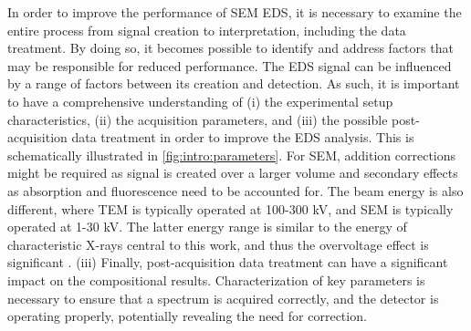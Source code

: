 In order to improve the performance of SEM EDS, it is necessary to examine the entire process from signal creation to interpretation, including the data treatment.
By doing so, it becomes possible to identify and address factors that may be responsible for reduced performance.
The EDS signal can be influenced by a range of factors between its creation and detection.
As such, it is important to have a comprehensive understanding of (i) the experimental setup characteristics, (ii) the acquisition parameters, and (iii) the possible post-acquisition data treatment in order to improve the EDS analysis.
This is schematically illustrated in \cref{fig:intro:parameters}.
For SEM, addition corrections might be required as signal is created over a larger volume and secondary effects as absorption and fluorescence need to be accounted for.
The beam energy is also different, where TEM is typically operated at 100-300 kV, and SEM is typically operated at 1-30 kV.
The latter energy range is similar to the energy of characteristic X-rays central to this work, and thus the overvoltage effect is significant \cite{williams_carter_companion_volume_2016}.
(iii) Finally, post-acquisition data treatment can have a significant impact on the compositional results.
Characterization of key parameters is necessary to ensure that a spectrum is acquired correctly, and the detector is operating properly, potentially revealing the need for correction.


